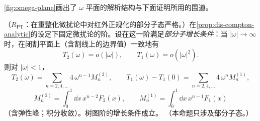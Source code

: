 \cref{fig:omega-plane}画出了 $\omega$ 平面的解析结构与下面证明所用的围道。


\begin{proposition}[色散关系：Taylor 系数 = 矩（部分子靶） \tagR]\label{prop:dis-dispersion}
（$R_{\mathrm{PT}}$：在重整化微扰论中对红外正规化的部分子态严格。）在\cref{prop:dis-compton-analytic}的设定下固定微扰论的阶。设在这一阶满足\emph{部分子增长条件}：当 $|\omega|\to\infty$ 时，在闭割平面上（含割线上的边界值）一致地有
\begin{equation}\label{eq:dis-pt-growth}
T_2(\omega)=o(|\omega|),\qquad T_1(\omega)=o(|\omega|^2).
\end{equation}
则对 $|\omega|<1$，
\begin{equation}\label{eq:dis-dispersion}
T_2(\omega)=\sum_{n=2,4,\dots}4\,\omega^{n-1}M^{(2)}_n,\qquad T_1(\omega)-T_1(0)=\sum_{n=2,4,\dots}4\,\omega^nM^{(1)}_n,
\end{equation}
\begin{equation}\label{eq:dis-moments-def}
M^{(2)}_n=\int_0^1\dd x\,x^{n-2}F_2(x),\qquad M^{(1)}_n=\int_0^1\dd x\,x^{n-1}F_1(x)
\end{equation}
（含弹性峰；积分收敛）。树图阶的增长条件成立。%
（本命题只涉及部分子态。）
\end{proposition}

